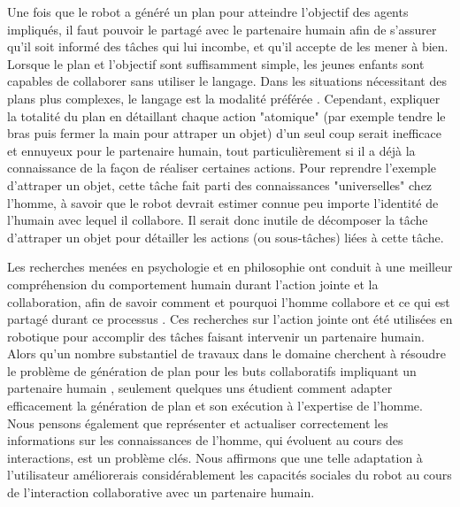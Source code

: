 \documentclass[a4paper,11pt,twoside]{StyleThese}
\begin{document}
Une fois que le robot a généré un plan pour atteindre l'objectif des agents impliqués, il faut pouvoir le partagé avec le partenaire humain afin de s'assurer qu'il soit informé des tâches qui lui incombe, et qu'il accepte de les mener à bien. Lorsque le plan et l'objectif sont suffisamment simple, les jeunes enfants sont capables de collaborer sans utiliser le langage. Dans les situations nécessitant des plans plus complexes, le langage est la modalité préférée \cite{Warneken2006,Warneken2007}. Cependant, expliquer la totalité du plan en détaillant chaque action "atomique" (par exemple tendre le bras puis fermer la main pour attraper un objet) d'un seul coup serait inefficace et ennuyeux pour le partenaire humain, tout particulièrement si il a déjà la connaissance de la façon de réaliser certaines actions. Pour reprendre l'exemple d'attraper un objet, cette tâche fait parti des connaissances "universelles" chez l'homme, à savoir que le robot devrait estimer connue peu importe l'identité de l'humain avec lequel il collabore. Il serait donc inutile de décomposer la tâche d'attraper un objet pour détailler les actions (ou sous-tâches) liées à cette tâche. 

Les recherches menées en psychologie et en philosophie ont conduit à une meilleur compréhension du comportement humain durant l'action jointe et la collaboration, afin de savoir comment \cite{tomasello2005} et pourquoi \cite{tomasello2009} l'homme collabore et ce qui est partagé durant ce processus \cite{Butterfill2011}.
%
%
%
%
Ces recherches sur l'action jointe ont été utilisées en robotique pour accomplir des tâches faisant intervenir un partenaire humain. Alors qu'un nombre substantiel de travaux dans le domaine cherchent à résoudre le problème de génération de plan pour les buts collaboratifs impliquant un partenaire humain \cite{lallement14}, seulement quelques uns étudient comment adapter efficacement la génération de plan et son exécution à l'expertise de l'homme. Nous pensons également que représenter et actualiser correctement les informations sur les connaissances de l'homme, qui évoluent au cours des interactions, est un problème clés. Nous affirmons que une telle adaptation à l'utilisateur améliorerais considérablement les capacités sociales du robot au cours de l'interaction collaborative avec un partenaire humain.
\end{document}
